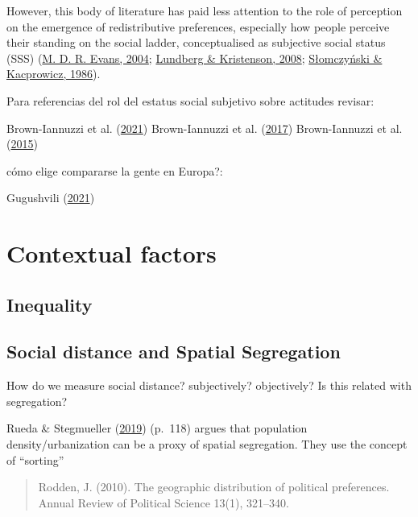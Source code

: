 \documentclass[
  12pt,
]{book}
\begin{document}
However, this body of literature has paid less attention to the role of perception on the emergence of redistributive preferences, especially how people perceive their standing on the social ladder, conceptualised as subjective social status (SSS) (\protect\hyperlink{ref-Evans2004}{M. D. R. Evans, 2004}; \protect\hyperlink{ref-Lundberg2008}{Lundberg \& Kristenson, 2008}; \protect\hyperlink{ref-slomczynski1987}{Słomczyński \& Kacprowicz, 1986}).

Para referencias del rol del estatus social subjetivo sobre actitudes revisar:

Brown-Iannuzzi et al. (\protect\hyperlink{ref-brown-iannuzzi_privileged_2021}{2021})
Brown-Iannuzzi et al. (\protect\hyperlink{ref-brown-iannuzzi_relationship_2017}{2017})
Brown-Iannuzzi et al. (\protect\hyperlink{ref-brown-iannuzzi_subjective_2015}{2015})

cómo elige compararse la gente en Europa?:

Gugushvili (\protect\hyperlink{ref-gugushvili_which_2021}{2021})

\hypertarget{contextual-factors}{%
\chapter{Contextual factors}\label{contextual-factors}}

\hypertarget{inequality}{%
\section{Inequality}\label{inequality}}

\hypertarget{social-distance-and-spatial-segregation}{%
\section{Social distance and Spatial Segregation}\label{social-distance-and-spatial-segregation}}

How do we measure social distance? subjectively? objectively? Is this related with segregation?

Rueda \& Stegmueller (\protect\hyperlink{ref-rueda_who_2019}{2019}) (p.~118) argues that population density/urbanization can be a proxy of spatial segregation. They use the concept of ``sorting''

\begin{quote}
Rodden, J. (2010). The geographic distribution of political preferences. Annual Review of Political Science 13(1), 321--340.
\end{quote}
\end{document}
